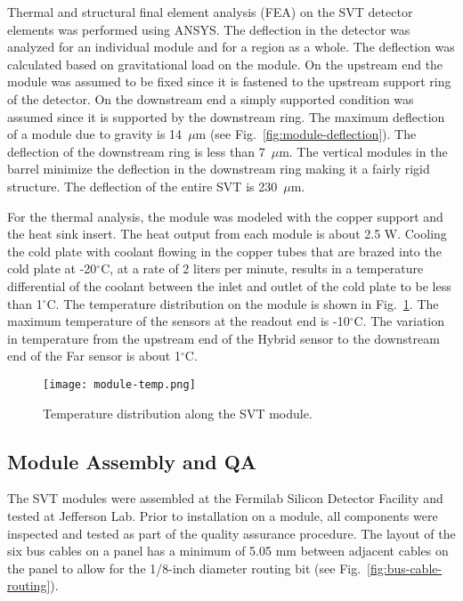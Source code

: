 Thermal and structural final element analysis (FEA) on the SVT detector elements was performed using ANSYS. The deflection in the detector was analyzed for an individual module and for a region as a whole. The deflection was calculated based on gravitational load on the module. On the upstream end the module was assumed to be fixed since it is fastened to the upstream support ring of the detector. On the downstream end a simply supported condition was assumed since it is supported by the downstream ring. The maximum deflection of a module due to gravity is 14~$\mu$m (see Fig.~\ref{fig:module-deflection}). The deflection of the downstream ring is less than 7~$\mu$m. The vertical modules in the barrel minimize the deflection in the downstream ring making it a fairly rigid structure. The deflection of the entire SVT is 230~$\mu$m. 

For the thermal analysis, the module was modeled with the copper support and the heat sink insert. The heat output from each module is about 2.5 W. Cooling the cold plate with coolant flowing in the copper tubes that are brazed into the cold plate at -20$^\circ$C, at a rate of 2 liters per minute, results in a temperature differential of the coolant between the inlet and outlet of the cold plate to be less than 1$^\circ$C. The temperature distribution on the module is shown in Fig.~\ref{fig:module-temp}. The maximum temperature of the sensors at the readout end is -10$^\circ$C. The variation in temperature from the upstream end of the Hybrid sensor to the downstream end of the Far sensor is about 1$^\circ$C.

\begin{figure}[hbt] 
\centering 
\texttt{[image: module-temp.png]}
\caption{Temperature distribution along the SVT module.}
\label{fig:module-temp}
\end{figure}

\subsection{Module Assembly and QA}

The SVT modules were assembled at the Fermilab Silicon Detector Facility and tested at Jefferson Lab. Prior to installation on a module, all components were inspected and tested as part of the quality assurance procedure.  
The layout of the six bus cables on a panel has a minimum of 5.05 mm between adjacent cables on the panel to allow for the 1/8-inch diameter routing bit (see Fig.~\ref{fig:bus-cable-routing}).

